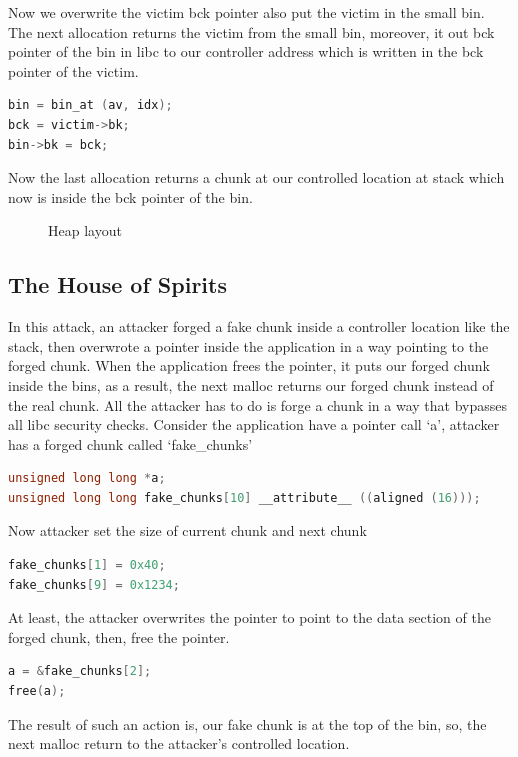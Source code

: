 \documentclass{masterthesis}
\begin{document}
Now we overwrite the victim bck pointer also put the victim in the small bin. The next allocation returns the victim from the small bin, moreover, it out bck pointer of the bin in libc to our controller address which is written in the bck pointer of the victim.

\begin{lstlisting}[language=c,frame=tlrb]
bin = bin_at (av, idx);
bck = victim->bk;
bin->bk = bck;
\end{lstlisting}

Now the last allocation returns a chunk at our controlled location at stack which now is inside the bck pointer of the bin. 

\begin{figure}[h!]
  \caption{Heap layout}
\end{figure}

\subsection{The House of Spirits}
In this attack, an attacker forged a fake chunk inside a controller location like the stack, then overwrote a pointer inside the application in a way pointing to the forged chunk. When the application frees the pointer, it puts our forged chunk inside the bins, as a result, the next malloc returns our forged chunk instead of the real chunk. All the attacker has to do is forge a chunk in a way that bypasses all libc security checks. Consider the application have a pointer call ‘a’, attacker has a forged chunk called ‘fake\_chunks’
\begin{lstlisting}[language=c,frame=tlrb]
unsigned long long *a;
unsigned long long fake_chunks[10] __attribute__ ((aligned (16)));
\end{lstlisting}
Now attacker set the size of current chunk and next chunk
\begin{lstlisting}[language=c,frame=tlrb]
fake_chunks[1] = 0x40;
fake_chunks[9] = 0x1234;
\end{lstlisting}
At least, the attacker overwrites the pointer to point to the data section of the forged chunk, then, free the pointer.
\begin{lstlisting}[language=c,frame=tlrb]
a = &fake_chunks[2];
free(a);
\end{lstlisting}
The result of such an action is, our fake chunk is at the top of the bin, so, the next malloc return to the attacker's controlled location.
\end{document}
